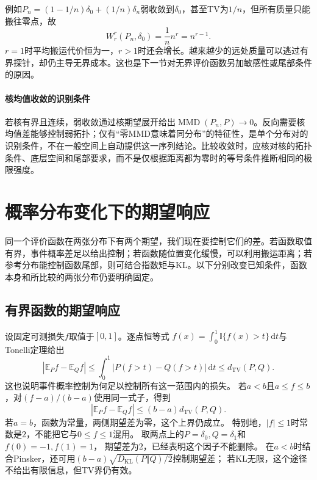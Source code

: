 例如\(P_n=(1-1/n)\delta_0+(1/n)\delta_n\)弱收敛到\(\delta_0\)，甚至TV为\(1/n\)，但所有质量只能搬往零点，故
\[
 W_r^r(P_n,\delta_0)=\frac1n n^r=n^{r-1}.
\]
\(r=1\)时平均搬运代价恒为一，\(r>1\)时还会增长。越来越少的远处质量可以逃过有界探针，却仍主导无界成本。这也是下一节对无界评价函数另加敏感性或尾部条件的原因。

\paragraph{核均值收敛的识别条件}
若核有界且连续，弱收敛通过核期望展开给出\(\operatorname{MMD}(P_n,P)\to0\)。反向需要核均值差能够控制弱拓扑；仅有“零MMD意味着同分布”的特征性，是单个分布对的识别条件，不在一般空间上自动提供这一序列结论。比较收敛时，应核对核的拓扑条件、底层空间和尾部要求，而不是仅根据距离都为零时的等号条件推断相同的极限强度。

\section{概率分布变化下的期望响应}
\label{sec:information-task-stability}
\label{sec:information-fixed-evaluation}

同一个评价函数在两张分布下有两个期望，我们现在要控制它们的差。若函数取值有界，事件概率差足以给出控制；若函数随位置变化缓慢，可以利用搬运距离；若参考分布能控制函数尾部，则可结合指数矩与KL。以下分别改变已知条件，函数本身和所比较的两张分布仍要明确固定。

\subsection{有界函数的期望响应}
\label{sec:information-bounded-evaluation}

设固定可测损失\(f\)取值于\([0,1]\)。逐点恒等式
\(f(x)=\int_0^1\mathbb I\{f(x)>t\}\,\mathrm dt\)与Tonelli定理给出
\[
  |\mathbb E_Pf-\mathbb E_Qf|
  \leq\int_0^1|P(f>t)-Q(f>t)|\,\mathrm dt
  \leq d_{\mathrm{TV}}(P,Q).
\]
这也说明事件概率控制为何足以控制所有这一范围内的损失。
若\(a<b\)且\(a\leq f\leq b\)，对\((f-a)/(b-a)\)使用同一式子，得到
\[
  |\mathbb E_Pf-\mathbb E_Qf|
  \leq(b-a)d_{\mathrm{TV}}(P,Q).
\]
若\(a=b\)，函数为常量，两侧期望差为零，这个上界仍成立。
特别地，\(|f|\leq1\)时常数是\(2\)，不能把它与\(0\leq f\leq1\)混用。
取两点上的\(P=\delta_0,Q=\delta_1\)和\(f(0)=-1,f(1)=1\)，
期望差为\(2\)，已经表明这个因子不能删除。
在\(a<b\)时结合Pinsker，还可用\((b-a)\sqrt{D_{\mathrm{KL}}(P\Vert Q)/2}\)控制期望差；
若KL无限，这个途径不给出有限信息，但TV界仍有效。

